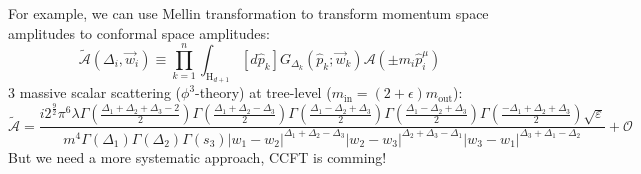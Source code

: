 \documentclass[aspectratio=169]{beamer}%
\begin{document}
	\begin{frame}
		For example, we can use Mellin transformation to transform momentum space amplitudes to conformal space amplitudes:
		\begin{equation}
			\widetilde{\mathcal{A}}(\Delta_i,\vec{w}_i)\equiv\prod_{k=1}^n\int_{\mathrm{H}_{d+1}}[d\hat{p}_k]G_{\Delta_k}(\hat{p}_k;\vec{w}_k)\mathcal{A}(\pm m_i\hat{p}_i^\mu)
		\end{equation}
		3 massive scalar scattering ($\phi^3$\mbox{-}theory) at tree-level ($m_\mathrm{in}=(2+\epsilon)m_\mathrm{out}$):
		\begin{equation}
			\widetilde{\mathcal{A}}=\frac{i2^{\frac92}\pi^6\lambda\Gamma(\frac{\Delta_1+\Delta_2+\Delta_3-2}{2})\Gamma(\frac{\Delta_1+\Delta_2-\Delta_3}{2})\Gamma(\frac{\Delta_1-\Delta_2+\Delta_3}{2})\Gamma(\frac{\Delta_1-\Delta_2+\Delta_3}{2})\Gamma(\frac{-\Delta_1+\Delta_2+\Delta_3}{2})\sqrt{\varepsilon}}{m^4\Gamma(\Delta_1)\Gamma(\Delta_2)\Gamma(s_3)|w_1-w_2|^{\Delta_1+\Delta_2-\Delta_3}|w_2-w_3|^{\Delta_2+\Delta_3-\Delta_1}|w_3-w_1|^{\Delta_3+\Delta_1-\Delta_2}}+\mathcal{O}
		\end{equation}
		But we need a more systematic approach, CCFT is comming!
	\end{frame}
\end{document}
